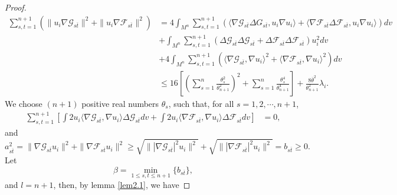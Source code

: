 \documentclass[12pt]{article}
\numberwithin{equation}{section}
\begin{document}
\begin{proof}
\begin{equation}\begin{aligned}\label{sum-pq-1}
\sum^{n+1}_{s,t=1}\left(\|u_{i}\nabla \mathcal{G}_{s\overline{t}}\|^{2}+\|u_{i}\nabla \mathcal{F}_{s\overline{t}}\|^{2}\right)&=
4\int_{M^{n}}\sum^{n+1}_{s,t=1}\left(\langle\nabla \mathcal{G}_{s\overline{t}}\Delta G_{s\overline{t}},u_{i}\nabla u_{i}\rangle
+\langle\nabla \mathcal{F}_{s\overline{t}}\Delta \mathcal{F}_{s\overline{t}},u_{i}\nabla u_{i}\rangle\right)dv
\\&+\int_{M^{n}}\sum^{n+1}_{s,t=1}\left(\Delta \mathcal{G}_{s\overline{t}}\Delta \mathcal{G}_{s\overline{t}}
+\Delta \mathcal{F}_{s\overline{t}}\Delta \mathcal{F}_{s\overline{t}}\right)u_{i}^{2}dv
\\&+4\int_{M^{n}}\sum^{n+1}_{s,t=1}\left(\langle\nabla \mathcal{G}_{s\overline{t}},\nabla u_{i}\rangle^{2}
+\langle\nabla \mathcal{F}_{s\overline{t}},\nabla u_{i}\rangle^{2}\right)dv\\&
\leq16\left[\left(\sum^{n}_{s=1}\frac{\theta_{s}^{2}}{\theta_{n+1}^{2}} \right)^{2}+\sum^{n}_{s=1}\frac{\theta_{s}^{4}}{\theta_{n+1}^{4}}\right]+\frac{8\overline{\theta}^{2}}{\theta^{2}_{n+1}}\lambda_{i}.
\end{aligned}\end{equation}We choose $(n+1)$ positive real numbers $\theta_{s}$, such that, for all $s=1,2,\cdots,n+1$,
\begin{equation}\begin{aligned}\label{5.20} \sum_{s,t=1}^{n+1}\left[\int2 u_{i}\langle\nabla \mathcal{G}_{s\overline{t}},\nabla u_{i}\rangle\Delta  \mathcal{G}_{s\overline{t}}
dv+\int2 u_{i}\langle\nabla \mathcal{F}_{s\overline{t}},\nabla u_{i}\rangle\Delta  \mathcal{F}_{s\overline{t}}
dv\right]&=0,\end{aligned}\end{equation}and
\begin{equation*}a_{s\overline{t}}^{2}=\|\nabla \mathcal{G}_{s\overline{t}}u_{i}\|^{2}+\|\nabla \mathcal{F}_{s\overline{t}}u_{i}\|^{2}
\geq\sqrt{\||\nabla \mathcal{G}_{s\overline{t}}|^{2}u_{i}\|^{2}}+\sqrt{\||\nabla \mathcal{F}_{s\overline{t}}|^{2}u_{i}\|^{2}}=b_{s\overline{t}}\geq0.\end{equation*}
Let  $$\beta=\min_{1\leq s,t\leq n+1}\{b_{s\overline{t}}\},$$
and $l=n+1$, then, by lemma \ref{lem2.1}, we have


\end{proof}
\end{document}
